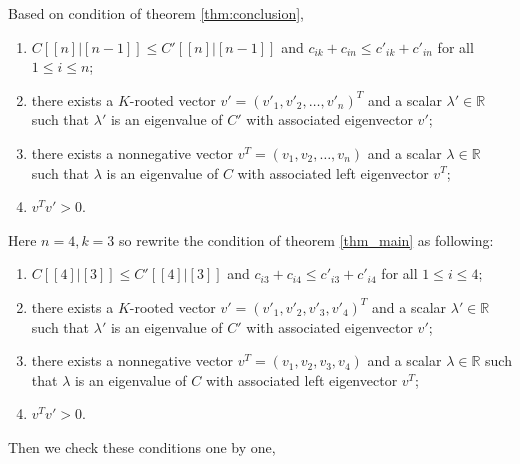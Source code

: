 \documentclass[12pt, a4paper]{article}
\theoremstyle{plain}
\theoremstyle{definition}
\begin{document}
    Based on condition of theorem \ref{thm:conclusion},
    \begin{enumerate}[label=(\roman*)]
        \item  $C[[n]|[n-1]]\leq C'[[n]|[n-1]]$ and $c_{ik}+c_{in}\leq c'_{ik}+c'_{in}$ for all $1\leq i\leq n$;
        \item  there exists a $K$-rooted vector $v'=(v'_1, v'_2, \ldots, v'_n)^T$ and a scalar $\lambda'\in \mathbb{R}$
        such that $\lambda'$ is an eigenvalue of $C'$ with associated eigenvector $v'$;
        \item there exists a nonnegative vector $v^T=(v_1, v_2, \ldots, v_n)$ and a scalar $\lambda\in \mathbb{R}$ 
        such that $\lambda$ is an eigenvalue of $C$ with associated left eigenvector $v^T$;
        \item $v^Tv'>0.$
    \end{enumerate}
    Here $n=4,k=3$ so rewrite the condition of theorem \ref{thm_main} as following:
    \begin{enumerate}[label=(\roman*)]
        \item  $C[[4]|[3]]\leq C'[[4]|[3]]$ and $c_{i3}+c_{i4}\leq c'_{i3}+c'_{i4}$ for all $1\leq i\leq 4$;
        \item  there exists a $K$-rooted vector $v'=(v'_1, v'_2, v'_3, v'_4)^T$ and a scalar $\lambda'\in \mathbb{R}$
        such that $\lambda'$ is an eigenvalue of $C'$ with associated eigenvector $v'$;
        \item there exists a nonnegative vector $v^T=(v_1, v_2, v_3, v_4)$ and a scalar $\lambda\in \mathbb{R}$ 
        such that $\lambda$ is an eigenvalue of $C$ with associated left eigenvector $v^T$;
        \item $v^Tv'>0.$
    \end{enumerate}
    Then we check these conditions one by one,
\end{document}
